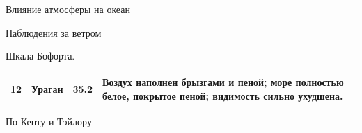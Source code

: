 \begin{chapter}{Влияние атмосферы на океан}
\begin{section}{Наблюдения за ветром}
\begin{paragraph}{Шкала Бофорта.}
\begin{table}
\begin{footnotesize}
\begin{tabular}{|p{}|p{}|p{}|p{}|}
12 & Ураган & 35.2 &
Воздух наполнен брызгами и пеной; море полностью белое, покрытое
пеной; видимость сильно ухудшена. \\
\hline
\end{tabular}
\end{footnotesize}
\centerline{По Кенту и Тэйлору~\cite{Kent:1997}}
\end{table}
%

\end{paragraph}
\end{section}
\end{chapter}
